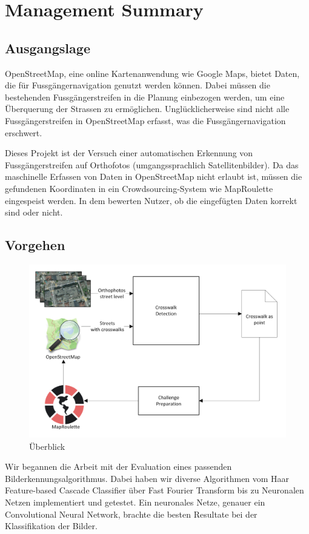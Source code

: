 \section{Management Summary}
\subsection*{Ausgangslage}
OpenStreetMap, eine online Kartenanwendung wie Google Maps, bietet Daten, die für Fussgängernavigation genutzt werden können. Dabei müssen die bestehenden Fussgängerstreifen in die Planung einbezogen werden, um eine Überquerung der Strassen zu ermöglichen. Unglücklicherweise sind nicht alle Fussgängerstreifen in OpenStreetMap erfasst, was die Fussgängernavigation erschwert.

Dieses Projekt ist der Versuch einer automatischen Erkennung von Fussgängerstreifen auf Orthofotos (umgangssprachlich Satellitenbilder). Da das maschinelle Erfassen von Daten in OpenStreetMap nicht erlaubt ist, müssen die gefundenen Koordinaten in ein Crowdsourcing-System wie MapRoulette eingespeist werden. In dem bewerten Nutzer, ob die eingefügten Daten korrekt sind oder nicht.

\subsection*{Vorgehen}
\begin{figure}[H]
	\centering
	\includegraphics[width=410pt]{images/management_summary_1.png}
	\caption[Management Summery Überblick]{Überblick}
\end{figure}
Wir begannen die Arbeit mit der Evaluation eines passenden Bilderkennungsalgorithmus. Dabei haben wir diverse Algorithmen vom Haar Feature-based Cascade Classifier über Fast Fourier Transform bis zu Neuronalen Netzen implementiert und getestet. Ein neuronales Netze, genauer ein Convolutional Neural Network, brachte die besten Resultate bei der Klassifikation der Bilder.

